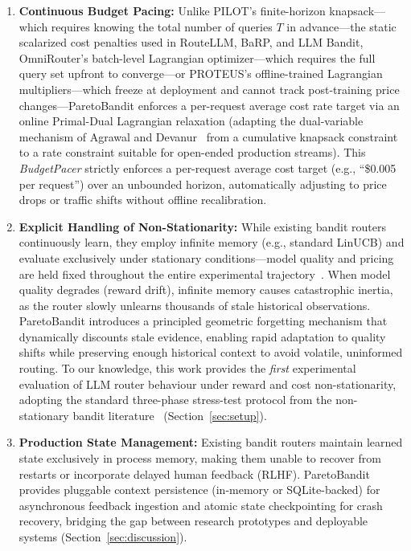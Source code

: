 \begin{enumerate}[leftmargin=*,nosep]
    \item \textbf{Continuous Budget Pacing:} Unlike PILOT's finite-horizon knapsack---which requires knowing the total number of queries $T$ in advance---the static scalarized cost penalties used in RouteLLM, BaRP, and LLM Bandit, OmniRouter's batch-level Lagrangian optimizer---which requires the full query set upfront to converge---or PROTEUS's offline-trained Lagrangian multipliers---which freeze at deployment and cannot track post-training price changes---ParetoBandit enforces a per-request average cost rate target via an online Primal-Dual Lagrangian relaxation (adapting the dual-variable mechanism of Agrawal and Devanur~\cite{agrawal2014bandits} from a cumulative knapsack constraint to a rate constraint suitable for open-ended production streams).  This \emph{BudgetPacer} strictly enforces a per-request average cost target (e.g., ``\$0.005 per request'') over an unbounded horizon, automatically adjusting to price drops or traffic shifts without offline recalibration.
    \item \textbf{Explicit Handling of Non-Stationarity:} While existing bandit routers continuously learn, they employ infinite memory (e.g., standard LinUCB) and evaluate exclusively under stationary conditions---model quality and pricing are held fixed throughout the entire experimental trajectory~\cite{panda2025pilot,wang2025barp,li2025llmbandit}. When model quality degrades (reward drift), infinite memory causes catastrophic inertia, as the router slowly unlearns thousands of stale historical observations. ParetoBandit introduces a principled geometric forgetting mechanism that dynamically discounts stale evidence, enabling rapid adaptation to quality shifts while preserving enough historical context to avoid volatile, uninformed routing. To our knowledge, this work provides the \emph{first} experimental evaluation of LLM router behaviour under reward and cost non-stationarity, adopting the standard three-phase stress-test protocol from the non-stationary bandit literature~\cite{garivier2011switching} (Section~\ref{sec:setup}).
    \item \textbf{Production State Management:} Existing bandit routers maintain learned state exclusively in process memory, making them unable to recover from restarts or incorporate delayed human feedback (RLHF). ParetoBandit provides pluggable context persistence (in-memory or SQLite-backed) for asynchronous feedback ingestion and atomic state checkpointing for crash recovery, bridging the gap between research prototypes and deployable systems (Section~\ref{sec:discussion}).

\end{enumerate}
